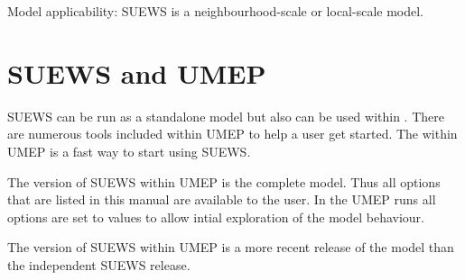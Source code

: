 \documentclass[letterpaper,10pt,english]{sphinxmanual}
\begin{document}
Model applicability: SUEWS is a neighbourhood-scale or local-scale
model.


\chapter{SUEWS and UMEP}
\label{\detokenize{suews-and-umep:suews-and-umep}}\label{\detokenize{suews-and-umep::doc}}
SUEWS can be run as a standalone model but also can be used within
. There are numerous
tools included within UMEP to help a user get started. The 
within UMEP is a fast way to start using SUEWS.

The version of SUEWS within UMEP is the complete model. Thus all options
that are listed in this manual are available to the user. In the UMEP
runs all options are set to values to allow intial exploration of the
model behaviour.

The version of SUEWS within UMEP is a more recent release of the model
than the independent SUEWS release.
\end{document}
